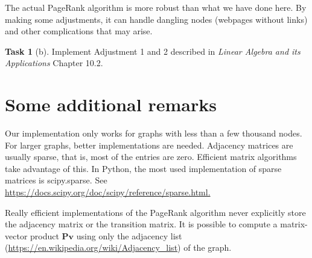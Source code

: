 \documentclass[a4paper]{scrartcl}
\theoremstyle{definition}
\newtheorem{task}{Task}
\begin{document}
\setcounter{task}{3}
The actual PageRank algorithm is more robust than what we have done here. By making some adjustments, it can handle dangling nodes (webpages without links) and other complications that may arise.
\begin{task}[b]Implement Adjustment 1 and 2 described in \emph{Linear Algebra and its Applications} Chapter 10.2.
\end{task}

\section{Some additional remarks}
Our implementation only works for graphs with less than a few thousand nodes. For larger graphs, better implementations are needed. Adjacency matrices are usually sparse, that is, most of the entries are zero. Efficient matrix algorithms take advantage of this. In Python, the most used implementation of sparse matrices is scipy.sparse. See \url{https://docs.scipy.org/doc/scipy/reference/sparse.html.}

Really efficient implementations of the PageRank algorithm never explicitly store the adjacency matrix or the transition matrix. It is possible to compute a matrix-vector product $\mathbf{P}\mathbf{v}$ using only the adjacency list (\url{https://en.wikipedia.org/wiki/Adjacency_list}) of the graph.
\end{document}
